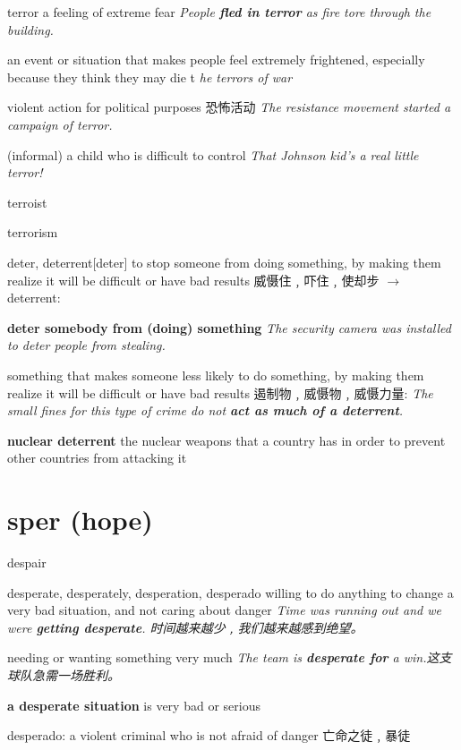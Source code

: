 \begin{DefWord}{terror}
    a feeling of extreme fear
    \textit{People \textbf{fled in terror} as fire tore through the building.}

    an event or situation that makes people feel extremely frightened, especially because they think they may die
    t 
    \textit{he terrors of war}

    violent action for political purposes 恐怖活动
    \textit{The resistance movement started a campaign of terror.}

    (informal) a child who is difficult to control
    \textit{That Johnson kid’s a real little terror!}

\end{DefWord}

\begin{DefWord}{terroist}
\end{DefWord}

\begin{DefWord}{terrorism}
\end{DefWord}

\begin{DefWord}{deter, deterrent}[deter]
    to stop someone from doing something, by making them realize it will be difficult or have bad results 威慑住﹐吓住﹐使却步 $\rightarrow$  deterrent:

    \textbf{deter somebody from (doing) something}
    \textit{The security camera was installed to deter people from stealing.}

    something that makes someone less likely to do something, by making them realize it will be difficult or have bad results 遏制物﹐威慑物﹐威慑力量:
    \textit{The small fines for this type of crime do not \textbf{act as much of a deterrent}.}

    \textbf{nuclear deterrent} the nuclear weapons that a country has in order to prevent other countries from attacking it
\end{DefWord}








\section{sper (hope)}

\begin{DefWord}{despair}
\end{DefWord}

\begin{DefWord}{desperate, desperately, desperation, desperado}
    willing to do anything to change a very bad situation, and not caring about danger
    \textit{Time was running out and we were \textbf{getting desperate}. 时间越来越少﹐我们越来越感到绝望。}

    needing or wanting something very much
    \textit{The team is \textbf{desperate for} a win.这支球队急需一场胜利。}

    \textbf{a desperate situation} is very bad or serious

    desperado:  a violent criminal who is not afraid of danger 亡命之徒﹐暴徒
\end{DefWord}


